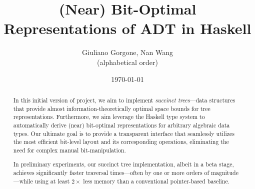 \documentclass[12pt,a4paper]{article}
\title{(Near) Bit-Optimal Representations of ADT in Haskell}
\author{Giuliano Gorgone, Nan Wang\\(alphabetical order)}
\date{\today}
\begin{document}
\newtheorem{remark}{Remark}
\maketitle

\begin{abstract}
    In this initial version of project, we aim to implement \emph{succinct trees}---data structures that provide almost information-theoretically optimal space bounds for tree representations. Furthermore, we aim leverage the Haskell type system to automatically derive (near) bit-optimal representations for arbitrary algebraic data types. Our ultimate goal is to provide a transparent interface that seamlessly utilizes the most efficient bit-level layout and its corresponding operations, eliminating the need for complex manual bit-manipulation. 

    In preliminary experiments, our succinct tree implementation, albeit in a beta stage, achieves significantly faster traversal times—often by one or more orders of magnitude—while using at least $2\times$ less memory than a conventional pointer-based baseline.
\end{abstract}

\vfill

\tableofcontents

\clearpage



%









\end{document}
